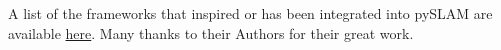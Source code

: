 \documentclass{article}
\providecommand{\tightlist}{%
  \setlength{\itemsep}{0pt}\setlength{\parskip}{0pt}}
\begin{document}
A list of the frameworks that inspired or has been integrated into pySLAM are available \href{https://github.com/luigifreda/pyslam?tab=readme-ov-file#credits}{here}. Many thanks to their Authors for their great work.
%
\end{document}
